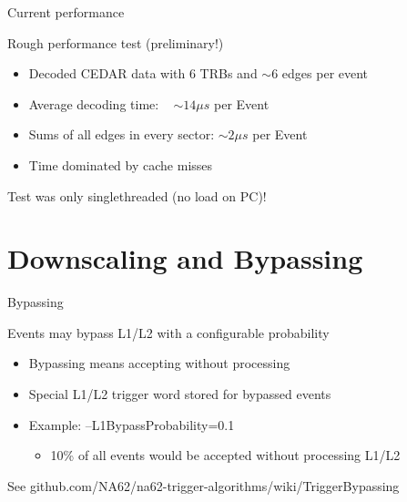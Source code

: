 \begin{frame}{Current performance}{}
	\begin{block}{Rough performance test (preliminary!)}
		\begin{itemize}
	  		\item Decoded CEDAR data with 6 TRBs and $\sim 6$ edges per event
	  		\item Average decoding time: ~	$\sim 14 \mu s$ per Event
	  		\item Sums of all edges in every sector: $\sim 2 \mu s$ per Event
	  		\item Time dominated by cache misses
		\end{itemize}
	\end{block}
	Test was only singlethreaded (no load on PC)!
\end{frame}

\section*{Downscaling and Bypassing}

\begin{frame}{Bypassing}{}
	\begin{block}{Events may bypass L1/L2 with a configurable probability}
		\begin{itemize}
		  	\item Bypassing means accepting without processing
		  	\item Special L1/L2 trigger word stored for bypassed events
	  		\item Example: --L1BypassProbability=0.1
	  		\begin{itemize}
	  			\item 10\% of all events would be accepted without processing L1/L2
	  		\end{itemize} 
		\end{itemize}
	\end{block}
	\vspace{0.5cm}
	See github.com/NA62/na62-trigger-algorithms/wiki/TriggerBypassing
\end{frame}

